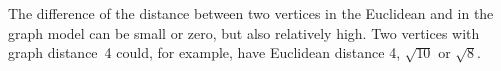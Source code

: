 \documentclass[smallextended]{svjour3}
\begin{document}
\begin{comment}
\subsection*{Hexagonal lattice: }
0($-\frac{\sqrt{3}}{2},+\frac{3}{2}$), 1($+\frac{\sqrt{3}}{2},+\frac{3}{2}$),
2($-\sqrt{3},+1$), 3($0,1$), 4($+\sqrt{3},+1$), 5($-\sqrt{3},0$),
6($0,0$), 7($+\sqrt{3},0$), 8($-\frac{3\cdot\sqrt{3}}{2},-\frac{1}{2}$),
9($-\frac{\sqrt{3}}{2},-\frac{1}{2}$), 10($+\frac{\sqrt{3}}{2},-\frac{1}{2}$),
11($+\frac{3\cdot\sqrt{3}}{2},-\frac{1}{2}$), 12($-\frac{3\cdot\sqrt{3}}{2},-\frac{3}{2}$),
13($-\frac{\sqrt{3}}{2},-\frac{3}{2}$), 14($+\frac{\sqrt{3}}{2},-\frac{3}{2}$),
15($+\frac{3\cdot\sqrt{3}}{2},-\frac{3}{2}$), 16($-\sqrt{3},-2$),
17($0,-2$), 18($+\sqrt{3},-2$), 19($-\sqrt{3},-3$), 20($0,-3$),
21($+\sqrt{3},-3$), 22($-\frac{\sqrt{3}}{2},-\frac{7}{2}$), 23($+\frac{\sqrt{3}}{2},-\frac{7}{2}$)
\subsection*{Square lattice:}
0($-2,+2$), 1($-1,+2$), 2($0,+2$), 3($+1,+2$), 4($+2,+2$), 5($-2,+1$),
6($-1,+1$), 7($0,+1$), 8($+1,+1$), 9($+2,+1$), 10($-2,0$), 11($-1,0$),
12($0,0$), 13($+1,0$), 14($+2,0$), 15($-2,-1$), 16($-1,-1$),
17($0,-1$), 18($+1,-1$), 19($+2,-1$), 20($-2,-2$), 21($-1,-2$),
22($0,-2$), 23($+1,-2$), 24($+2,-2$)
\subsection*{Triangular lattice:}
c, 3($+3,0$), 4($+4,0$), 5($+\frac{1}{2},+\frac{\sqrt{3}}{2}$),
6($+\frac{3}{2},+\frac{\sqrt{3}}{2}$), 7($+\frac{5}{2},+\frac{\sqrt{3}}{2}$),
8($+\frac{7}{2},+\frac{\sqrt{3}}{2}$), 9($0,+\sqrt{3}$), 10($+1,+\sqrt{3}$),
11($+2,+\sqrt{3}$), 12($+3,+\sqrt{3}$), 13($+4,+\sqrt{3}$), 14($+\frac{1}{2},+\frac{3\cdot\sqrt{3}}{2}$),
15($+\frac{3}{2},+\frac{3\cdot\sqrt{3}}{2}$), 16($+\frac{5}{2},+\frac{3\cdot\sqrt{3}}{2}$),
17($+\frac{7}{2},+\frac{3\cdot\sqrt{3}}{2}$), 18($0,+2\cdot\sqrt{3}$),
19($+1,+2\cdot\sqrt{3}$), 20($+2,+2\cdot\sqrt{3}$), 21($+3,+2\cdot\sqrt{3}$),
22($+4,+2\cdot\sqrt{3}$)
\end{comment}


The difference of the distance between two vertices in the Euclidean and in the
graph model can be small or zero, but also relatively high.
Two vertices with graph distance~4 could, for example, have Euclidean distance 4,
$\sqrt{10}$ or $\sqrt{8}$.
\end{document}
